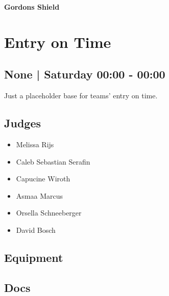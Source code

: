 \documentclass[10pt]{article}
\newcommand{\newtitle}[1]{\begin{center}{\Huge\bfseries #1 }\\ \vspace{5mm}\end{center}}
\begin{document}
	
	\newtitle{Gordons Shield}


		\begin{minipage}{\linewidth}
		\setcounter{section}{0}
	\section{Entry on Time }
	\subsection*{None | Saturday 00:00 - 00:00}

	Just a placeholder base for teams' entry on time.

	\begin{multicols}{2}
	\subsection*{\faUsers \: Judges}
	\begin{itemize}
			\item Melissa Rijs
			\item Caleb Sebastian Serafin
			\item Capucine Wiroth
			\item Asmaa Marcus
			\item Orsella Schneeberger
			\item David Bosch
		\end{itemize}
	\columnbreak
	\subsection*{\faWrench \: Equipment}
	        \vfill\null
        \subsection*{\faFile \: Docs}
     	\end{multicols}


	\vspace{1cm}
	\end{minipage}
\end{document}
